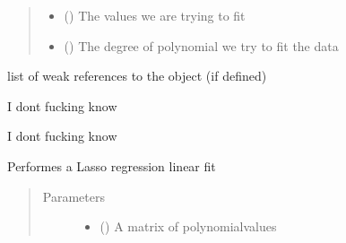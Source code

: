 \documentclass[letterpaper,10pt,english]{sphinxmanual}
\begin{document}
\begin{fulllineitems}
\begin{fulllineitems}
\begin{quote}
\begin{description}
\begin{itemize}
\item {} 
 () \textendash{} The values we are trying to fit

\item {} 
 () \textendash{} The degree of polynomial we try to fit the data

\end{itemize}

\end{description}\end{quote}

\end{fulllineitems}


\begin{fulllineitems}
\label{\detokenize{index:cls_reg.LinReg.__weakref__}}
list of weak references to the object (if defined)

\end{fulllineitems}


\begin{fulllineitems}
\label{\detokenize{index:cls_reg.LinReg.bootstrap}}
I dont fucking know

\end{fulllineitems}


\begin{fulllineitems}
\label{\detokenize{index:cls_reg.LinReg.kfold}}
I dont fucking know

\end{fulllineitems}


\begin{fulllineitems}
\label{\detokenize{index:cls_reg.LinReg.lasso}}
Performes a Lasso regression linear fit
\begin{quote}\begin{description}
\item[{Parameters}] \leavevmode\begin{itemize}
\item {} 
 () \textendash{} A matrix of polynomialvalues


\end{itemize}
\end{description}
\end{quote}
\end{fulllineitems}
\end{fulllineitems}
\end{document}
